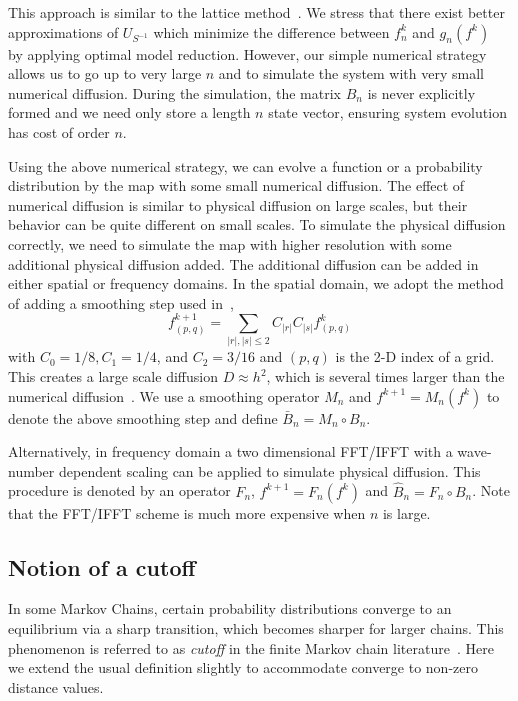 \documentclass[twocolumn,10pt]{asme2e}
\begin{document}
This approach is similar to the lattice
method~\cite{Pierrehumbert2000, Tsang2005}. We stress that there exist
better approximations of $U_{S^{-1}}$ which minimize the difference
between $f_n^k$ and $g_n(f^k)$~\cite{Froyland2001} by applying optimal
model reduction. However, our simple numerical strategy allows us to
go up to very large $n$ and to simulate the system with very small
numerical diffusion. During the simulation, the matrix $B_n$ is never
explicitly formed and we need only store a length $n$ state vector,
ensuring system evolution has cost of order $n$.


Using the above numerical strategy, we can evolve a function or a
probability distribution by the map with some small numerical
diffusion. The effect of numerical diffusion is similar to physical
diffusion on large scales, but their behavior can be quite different
on small scales. To simulate the physical diffusion correctly, we need
to simulate the map with higher resolution with some additional
physical diffusion added. The additional diffusion can be added in
either spatial or frequency domains. In the spatial domain, we adopt
the method of adding a smoothing step used in~\cite{Tsang2005},
 \begin{equation}
 \label{smoothingstep}
   f^{k+1}_{(p,q)} = \sum_{|r|,|s|\le 2}C_{|r|}C_{|s|}f^{k}_{(p,q)}
 \end{equation}
with $C_0=1/8, C_1=1/4$, and $C_2=3/16$ and $(p,q)$ is the 2-D index
of a grid. This creates a large scale diffusion $D \approx h^2$, which
is several times larger than the numerical
diffusion~\cite{Tsang2005}. We use a smoothing operator $M_n$ and
$f^{k+1} = M_n(f^{k})$ to denote the above smoothing step and define
$\bar{B}_n = M_n \circ B_n$.

Alternatively, in frequency domain a two dimensional FFT/IFFT with a
wave-number dependent scaling can be applied to simulate physical
diffusion. This procedure is denoted by an operator $F_n$, $f^{k+1} =
F_n(f^{k})$ and $\hat{B}_n = F_n \circ B_n$. Note that the FFT/IFFT
scheme is much more expensive when $n$ is large.


\subsection*{Notion of a cutoff}
In some Markov Chains, certain probability distributions converge to
an equilibrium via a sharp transition, which becomes sharper for
larger chains. This phenomenon is referred to as \emph{cutoff} in the
finite Markov chain literature~\cite{Diaconis2005}. Here we
extend the usual definition slightly to accommodate converge to
non-zero distance values.
\end{document}
